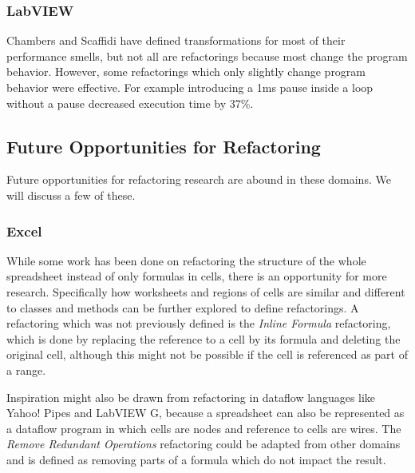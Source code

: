 \documentclass[10pt,conference,compsocconf]{IEEEtran}
\begin{document}
\subsubsection{LabVIEW}

Chambers and Scaffidi \cite{chambers2015impact} have defined transformations for most of their performance smells, but not all are refactorings because most change the program behavior.
However, some refactorings which only slightly change program behavior were effective. For example introducing a 1ms pause inside a loop without a pause decreased execution time by 37\%.

\subsection{Future Opportunities for Refactoring}

Future opportunities for refactoring research are abound in these domains. We will discuss a few of these.

\subsubsection{Excel}

While some work has been done on refactoring the structure of the whole spreadsheet instead of only formulas in cells, there is an opportunity for more research. 
Specifically how worksheets and regions of cells are similar and different to classes and methods can be further explored to define refactorings.
A refactoring which was not previously defined is the \emph{Inline Formula} refactoring, which is done by replacing the reference to a cell by its formula and deleting the original cell, although this might not be possible if the cell is referenced as part of a range.


Inspiration might also be drawn from refactoring in dataflow languages like Yahoo! Pipes and LabVIEW G, because a spreadsheet can also be represented as a dataflow program in which cells are nodes and reference to cells are wires.
The \emph{Remove Redundant Operations} refactoring could be adapted from other domains and is defined as removing parts of a formula which do not impact the result.
\end{document}
